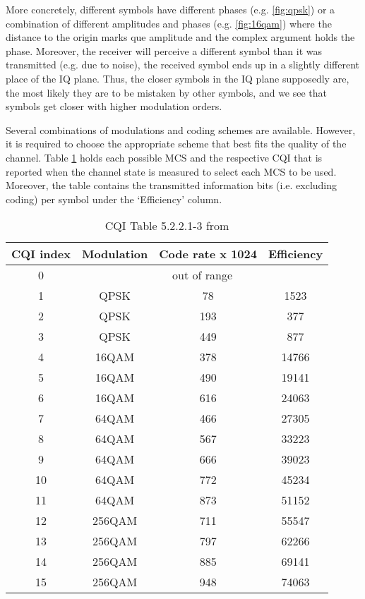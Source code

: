 More concretely, different symbols have different phases (e.g. \ref{fig:qpsk}) or a combination of different amplitudes and phases (e.g. \ref{fig:16qam}) where the distance to the origin marks que amplitude and the complex argument holds the phase. Moreover, the receiver will perceive a different symbol than it was transmitted (e.g. due to noise), the received symbol ends up in a slightly different place of the \ac{IQ} plane. Thus, the closer symbols in the \ac{IQ} plane supposedly are, the most likely they are to be mistaken by other symbols, and we see that symbols get closer with higher modulation orders.

Several combinations of modulations and coding schemes are available. However, it is required to choose the appropriate scheme that best fits the quality of the channel. Table \ref{tab:mcs} holds each possible \ac{MCS} and the respective \ac{CQI} that is reported when the channel state is measured to select each \ac{MCS} to be used. Moreover, the table contains the transmitted information bits (i.e. excluding coding) per symbol under the `Efficiency' column.

\begin{table}[h]
    \centering
    \caption{\ac{CQI} Table 5.2.2.1-3 from \cite{3gpp-codebooks}}
    \label{tab:mcs}
    \begin{tabular}{|c|c|c|c|}
    \hline
    {\textbf{CQI index}} & {\textbf{Modulation}} & { \textbf{Code rate x 1024}} & {\textbf{Efficiency}} \\ \hline
    0                                      & \multicolumn{3}{c|}{out of range}                                                                         \\ \hline
    1  & QPSK   & 78  & 1523  \\ \hline
    2  & QPSK   & 193 & 377   \\ \hline
    3  & QPSK   & 449 & 877   \\ \hline
    4  & 16QAM  & 378 & 14766 \\ \hline
    5  & 16QAM  & 490 & 19141 \\ \hline
    6  & 16QAM  & 616 & 24063 \\ \hline
    7  & 64QAM  & 466 & 27305 \\ \hline
    8  & 64QAM  & 567 & 33223 \\ \hline
    9  & 64QAM  & 666 & 39023 \\ \hline
    10 & 64QAM  & 772 & 45234 \\ \hline
    11 & 64QAM  & 873 & 51152 \\ \hline
    12 & 256QAM & 711 & 55547 \\ \hline
    13 & 256QAM & 797 & 62266 \\ \hline
    14 & 256QAM & 885 & 69141 \\ \hline
    15 & 256QAM & 948 & 74063 \\ \hline
    \end{tabular}
\end{table}


